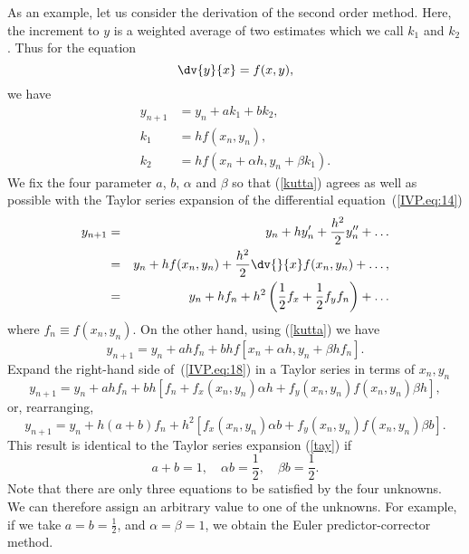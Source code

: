 As an example, let us consider the derivation of the second order
method.  Here, the increment to $y$ is a weighted average of two
estimates which we call $k_1$ and $k_2$. Thus for the equation
%
\begin{equation}
  \dv{y}{x} = f(x,y),
  \label{IVP.eq:14}
\end{equation}
%
we have
%
\begin{align}
  y_{n+1} & = y_n+a k_1+bk_2, \label{kutta} \\
  k_1    & = h f(x_n,y_n), \label{IVP.eq:15} \\
  k_2    & = h f(x_n + \alpha h, y_n + \beta k_1).\label{IVP.eq:16}
\end{align}
%
We fix the four parameter $a$, $b$, $\alpha$ and $\beta$ so that
(\ref{kutta}) agrees as well as possible with the Taylor series
expansion of the differential equation~(\ref{IVP.eq:14})
%
\begin{eqnarray}
  y_{n+1} & = & y_n + h y_n' + \frac{h^2}{2} y_n'' + \ldots \nonumber \\
  & = & y_n + h f(x_n,y_n) + \frac{h^2}{2} \dv{}{x} f(x_n,
  y_n) + \dots, \nonumber \\
  & = & y_n + h f_n + h^2 \left (\frac{1}{2} f_x +
    \frac{1}{2}f_y f_n \right ) + \dots
  \label{tay}
\end{eqnarray}
%
where $f_n \equiv f(x_n,y_n)$.  On the other hand, using (\ref{kutta})
we have
%
\begin{equation}
  y_{n+1} = y_n + a h f_n + b h f[x_n+\alpha h, y_n+\beta h f_n].
  \label{IVP.eq:18}
\end{equation}
%
Expand the right-hand side of~(\ref{IVP.eq:18}) in a Taylor series
in terms of $x_n,y_n$
%
\begin{equation}
  y_{n+1} = y_n + a h f_n + b h \left [ f_n + f_x(x_n,y_n) \alpha h +
    f_y(x_n,y_n) f(x_n,y_n) \beta h \right ],
  \label{IVP.eq:19}
\end{equation}
%
or, rearranging,
%
\begin{equation}
  y_{n+1} = y_n + h (a+b) f_n + h^2 \left [ f_x(x_n,y_n) \alpha b +
    f_y(x_n,y_n) f(x_n,y_n) \beta b \right ].
  \label{IVP.eq:20}
\end{equation}
%
This result is identical to the Taylor series expansion (\ref{tay}) if
%
\begin{equation}
  a+b=1, \quad \alpha b=\frac{1}{2}, \quad\beta b=\frac{1}{2}.
  \label{IVP.eq:21}
\end{equation}
%
Note that there are only three equations to be satisfied by the four
unknowns. We can therefore assign an arbitrary value to one of the
unknowns. For example, if we take $a=b=\frac{1}{2}$, and
$\alpha=\beta=1$, we obtain the Euler predictor-corrector method.


